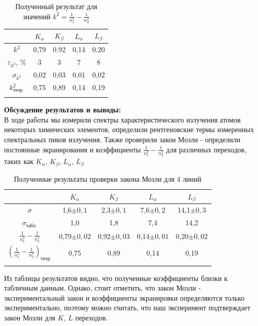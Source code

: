 \documentclass[a4paper, 12pt]{article}%
\begin{document}
		\newpage
		
			\begin{longtable}{|c|c|c|c|c|}
				\hline
				& $K_{\alpha}$ & $K_{\beta}$ & $L_{\alpha}$ & $L_{\beta}$ \\ \hline
				$k^2$ & 0,79 & 0.92 & 0,14 & 0.20 \\ \hline
				$\varepsilon_{k^2}$, \% & 3 & 3 & 7 & 8\\ \hline
				$\sigma_{k^2}$ & 0,02 & 0,03 & 0,01 & 0,02\\ \hline
				$k^2_{\text{теор.}}$ & 0,75 & 0,89 & 0,14 & 0,19 \\ \hline
			\caption{Полученный результат для значений $k^2 = \frac{1}{n_1^2} - \frac{1}{n_2^2}$}
			\end{longtable}


			\textbf{Обсуждение результатов и выводы: }\\
			
			В ходе работы мы измерили спектры характеристического излучения атомов некоторых химических элементов, определили рентгеновские термы измеренных спектральных пиков излучения. Также проверили закон Мозли - определили постоянные экранирования и коэффициенты $\frac{1}{n_1^2} - \frac{1}{n_2^2}$ для различных переходов, таких как $K_{\alpha}$, $K_{\beta}$,  $L_{\alpha}$, $L_{\beta}$
			
			\begin{longtable}{|c|c|c|c|c|}
				\hline
				& $K_{\alpha}$ & $K_{\beta}$ & $L_{\alpha}$ & $L_{\beta}$ \\ \hline
				$\sigma$ & 1,6$\pm 0,1$ & 2,3$\pm 0,1$ & 7,6$\pm 0,2$ & 14,1$\pm 0,3$ \\ \hline
				$\sigma_{\text{табл.}}$ & 1,0 & 1,8 & 7,4 & 14,2 \\ \hline
				$\frac{1}{n_1^2} - \frac{1}{n_2^2}$ & 0,79$\pm 0,02$ & 0,92$\pm 0,03$ & 0,14$\pm 0,01$ & 0,20$\pm 0,02$ \\ \hline
				$(\frac{1}{n_1^2} - \frac{1}{n_2^2})_{\text{теор.}}$ & 0,75 & 0,89 & 0,14 & 0,19 \\ \hline
				\caption{Полученные результаты проверки закона Мозли для 4 линий}
			\end{longtable}
			
			Из таблицы результатов видно, что полученные коэффициенты близки к табличным данным. Однако, стоит отметить, что закон Мозли - экспериментальный закон и коэффициенты экранировки определяются только экспериментально, поэтому можно считать, что наш эксперимент подтверждает закон Мозли для  $K$,  $L$ переходов. \\
			
\end{document}

